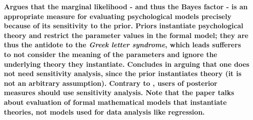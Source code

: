 \documentclass[12pt]{scrartcl}
\begin{document}
\begin{description}
  \item {}
  
  \textbf{Argues that the marginal likelihood - and thus the Bayes factor - is an appropriate measure for evaluating psychological models precisely because of its sensitivity to the prior. Priors instantiate psychological theory and restrict the parameter values in the formal model; they are thus the antidote to the \emph{Greek letter syndrome}, which leads sufferers to not consider the meaning of the parameters and ignore the underlying theory they instantiate. Concludes in arguing that one does not need sensitivity analysis, since the prior instantiates theory (it is not an arbitrary assumption). Contrary to \cite{liu2008bayes}, users of posterior measures should use sensitivity analysis. Note that the paper talks about evaluation of formal mathematical models that instantiate theories, not models used for data analysis like regression.}
\end{description}
\end{document}
